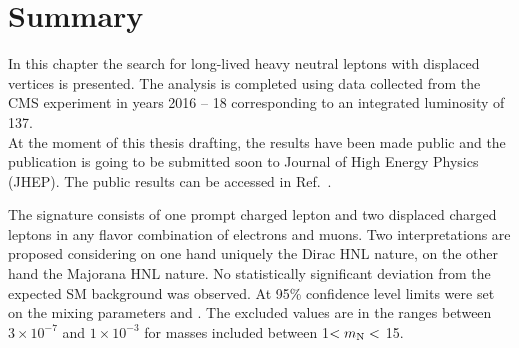 \clearpage
\section{Summary}
In this chapter the search for long-lived heavy neutral leptons with displaced
vertices is presented. The analysis is completed using data collected from the
CMS experiment in years 2016 -- 18 corresponding to an integrated
luminosity of 137\fbinv.\\
At the moment of this thesis drafting, the results have been made
public and the publication is going to be submitted soon to Journal
of High Energy Physics (JHEP). The public results can be accessed in
Ref.~\cite{CMS-PAS-EXO-20-009}.

The signature consists of one prompt charged lepton and two displaced
charged leptons in any flavor combination of electrons
and muons. Two interpretations are proposed considering on one hand uniquely the
Dirac HNL nature, on the other hand the Majorana HNL nature. 
No statistically significant deviation from the expected
SM background was observed. At 95\% confidence level limits were set on the mixing
parameters \mixpare and \mixparm.
The excluded values are in the
ranges between $3\times 10^{-7}$ and $1\times 10^{-3}$ for masses included
between 1\GeV $< m_\mathrm{N} <$ 15\GeV. 

